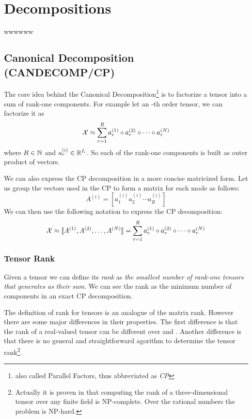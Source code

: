 \chapter{Decompositions}
wwwwww

\section{Canonical Decomposition (CANDECOMP/CP)}
The core idea behind the Canonical Decomposition\footnote{also called Parallel Factors, thus abbreviated as \emph{CP}} is to factorize a tensor into a sum of rank-one components. For example let \X an \N-th order tensor, we can factorize it as
\begin{equation}
  \mathcal{X} \approx \sum_{r = 1}^R a_r^{(1)} \circ a_r^{(2)} \circ \cdots \circ a_r^{(N)}
\end{equation}
where $R \in \mathbb{N}$ and $a_r^{(i)} \in \mathbb{R}^{I_i}$. So each of the rank-one components is built as outer product of \N vectors.

We can also express the CP decomposition in a more concise matricized form.
Let us group the vectors used in the CP to form a matrix for each mode  as follows:
\begin{equation*}
  A^{(i)} = [ a^{(i)}_1 a^{(i)}_2 \cdots a^{(i)}_R ]
\end{equation*}
We can then use the following notation to express the CP decomposition:
\begin{equation*}
  \mathcal{X} \approx \llbracket A^{(1)}, A^{(2)}, \ldots, A^{(N)} \rrbracket = \sum_{r = 1}^R a_r^{(1)} \circ a_r^{(2)} \circ \cdots \circ a_r^{(N)}
\end{equation*}

\subsection{Tensor Rank}
Given a tensor \X we can define its \emph{rank} as \emph{the smallest number of rank-one tensors that generates \X as their sum}. We can see the rank as the minimum number of components in an exact CP decomposition.

The definition of rank for tensors is an analogue of the matrix rank. However there are some major differences in their properties.
The first difference is that the rank of a real-valued tensor can be different over \RR and \CC {}. Another difference is that there is no general and straightforward agorithm to determine the tensor rank\footnote{Actually it is proven in \cite{rankNP} that computing the rank of a three-dimensional tensor over any finite field is NP-complete. Over the rational numbers the problem is NP-hard.}.

